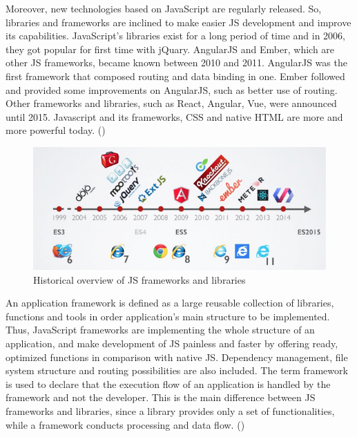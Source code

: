 Moreover, new technologies based on JavaScript are regularly released. So, libraries and frameworks are inclined to make easier JS development and improve its capabilities. JavaScript's libraries exist for a long period of time and in 2006, they got popular for first time with jQuary. AngularJS and Ember, which are other JS frameworks, became known between 2010 and 2011. AngularJS was the first framework that composed routing and data binding in one. Ember followed and provided some improvements on AngularJS, such as better use of routing. Other frameworks and libraries, such as React, Angular, Vue, were announced until 2015. Javascript and its frameworks, CSS and native HTML are more and more powerful today. (\cite{Reference6}) \par

\begin{figure}[h!]
	\begin{center}
		\includegraphics[scale=0.5]{images/history-of-frameworks.png}
	\end{center}
	\caption{Historical overview of JS frameworks and libraries}
\end{figure}

An application framework is defined as a large reusable collection of libraries, functions and tools in order application's main structure to be implemented. Thus, JavaScript frameworks are implementing the whole structure of an application, and make development of JS painless and faster by offering ready, optimized functions in comparison with native JS. Dependency management, file system structure and routing possibilities are also included. The term framework is used to declare that the execution flow of an application is handled by the framework and not the developer. This is the main difference between JS frameworks and libraries, since a library provides only a set of functionalities, while a framework conducts processing and data flow. (\cite{Reference6}) \par

